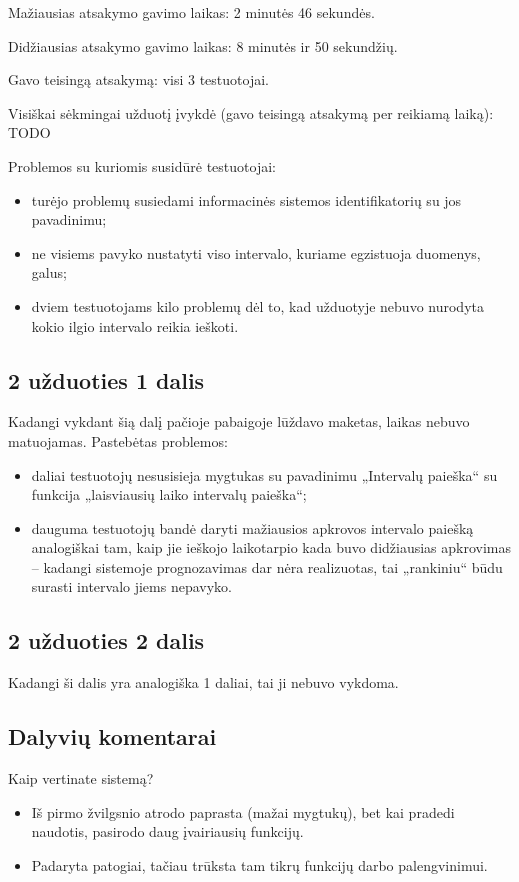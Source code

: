 Mažiausias atsakymo gavimo laikas: 2 minutės 46 sekundės.

Didžiausias atsakymo gavimo laikas: 8 minutės ir 50 sekundžių.

Gavo teisingą atsakymą: visi 3 testuotojai.

Visiškai sėkmingai užduotį įvykdė (gavo teisingą atsakymą per reikiamą 
laiką): TODO

Problemos su kuriomis susidūrė testuotojai:
\begin{itemize}
  \item turėjo problemų susiedami informacinės sistemos identifikatorių
    su jos pavadinimu;
  \item ne visiems pavyko nustatyti viso intervalo, kuriame egzistuoja
    duomenys, galus;
  \item dviem testuotojams kilo problemų dėl to, kad užduotyje nebuvo
    nurodyta kokio ilgio intervalo reikia ieškoti.
\end{itemize}

\subsection{2 užduoties 1 dalis}

Kadangi vykdant šią dalį pačioje pabaigoje lūždavo maketas, laikas
nebuvo matuojamas. Pastebėtas problemos:
\begin{itemize}
  \item daliai testuotojų nesusisieja mygtukas su pavadinimu „Intervalų
    paieška“ su funkcija „laisviausių laiko intervalų paieška“;
  \item dauguma testuotojų bandė daryti mažiausios apkrovos intervalo
    paiešką analogiškai tam, kaip jie ieškojo laikotarpio kada buvo
    didžiausias apkrovimas – kadangi sistemoje prognozavimas dar nėra
    realizuotas, tai „rankiniu“ būdu surasti intervalo jiems nepavyko.
\end{itemize}

\subsection{2 užduoties 2 dalis}

Kadangi ši dalis yra analogiška 1 daliai, tai ji nebuvo vykdoma.

\subsection{Dalyvių komentarai}

Kaip vertinate sistemą?
\begin{itemize}
  \item Iš pirmo žvilgsnio atrodo paprasta (mažai mygtukų), bet
    kai pradedi naudotis, pasirodo daug įvairiausių funkcijų.
  \item Padaryta patogiai, tačiau trūksta tam tikrų funkcijų darbo
    palengvinimui.
\end{itemize}


